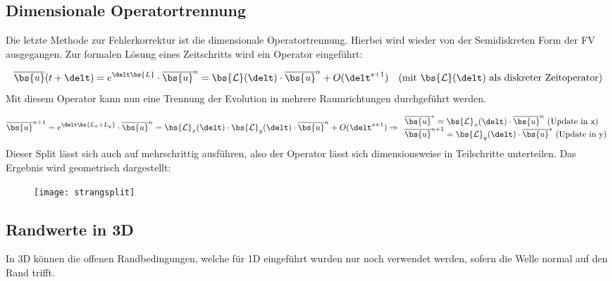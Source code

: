 \subsection{Dimensionale Operatortrennung}
Die letzte Methode zur Fehlerkorrektur ist die dimensionale Operatortrennung. Hierbei wird wieder von der Semidiskreten Form der FV ausgegangen. Zur formalen L\"osung eines Zeitschritts wird ein Operator eingef\"uhrt:
\par
\begin{equation*}
	\overline{\bs{u}}(t+\delt) = e^{\delt\bs{L}}\cdot \overline{\bs{u}}^n = \bs{\mathcal{L}}(\delt)\cdot\overline{\bs{u}}^n + O(\delt^{s+1})~~~\textrm{(mit }\bs{\mathcal{L}}(\delt)\textrm{ als diskreter Zeitoperator)}
\end{equation*}
Mit diesem Operator kann nun eine Trennung der Evolution in mehrere Raumrichtungen durchgef\"uhrt werden.
\par
\begin{equation*}
	\overline{\bs{u}}^{n+1} = e^{\delt\bs{L_x + L_y}}\cdot \overline{\bs{u}}^n = \bs{\mathcal{L}}_x(\delt)\cdot\bs{\mathcal{L}}_y(\delt)\cdot\overline{\bs{u}}^n + O(\delt^{s+1})
	\Rightarrow
	\begin{array}{ll} \overline{\bs{u}}^{*} = \bs{\mathcal{L}}_x(\delt) \cdot \overline{\bs{u}}^n \textrm{ (Update in x)} \\ \overline{\bs{u}}^{n+1} = \bs{\mathcal{L}}_y(\delt)\cdot\overline{\bs{u}}^{*} \textrm{ (Update in y)}\end{array}
\end{equation*}
Dieser Split l\"asst sich auch auf mehrschrittig ausf\"uhren, also der Operator l\"asst sich dimensionsweise in Teilschritte unterteilen. Das Ergebnis wird geometrisch dargestellt:
\par
\begin{figure}[ht]
	\centering
	\texttt{[image: strangsplit]}
\end{figure}


\subsection{Randwerte in 3D}
In 3D k\"onnen die offenen Randbedingungen, welche f\"ur 1D eingef\"uhrt wurden nur noch verwendet werden, sofern die Welle normal auf den Rand trifft.



